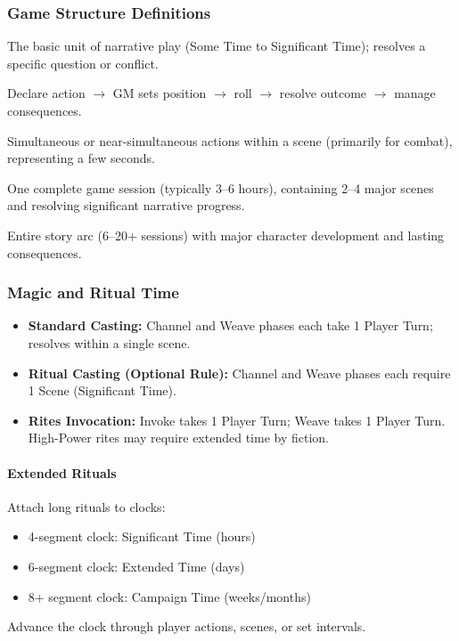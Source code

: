 \subsubsection{Game Structure Definitions}
\begin{description}[leftmargin=1.5em, labelindent=0em]
  \item[Scene] The basic unit of narrative play (Some Time to Significant Time); resolves a specific question or conflict.
  \item[Player Turn (Beat)] Declare action $\rightarrow$ GM sets position $\rightarrow$ roll $\rightarrow$ resolve outcome $\rightarrow$ manage consequences.
  \item[Round] Simultaneous or near-simultaneous actions within a scene (primarily for combat), representing a few seconds.
  \item[Session] One complete game session (typically 3–6 hours), containing 2–4 major scenes and resolving significant narrative progress.
  \item[Campaign] Entire story arc (6–20+ sessions) with major character development and lasting consequences.
\end{description}

\subsubsection{Magic and Ritual Time}
\begin{itemize}
  \item \textbf{Standard Casting:} Channel and Weave phases each take 1 Player Turn; resolves within a single scene.
  \item \textbf{Ritual Casting (Optional Rule):} Channel and Weave phases each require 1 Scene (Significant Time).
  \item \textbf{Rites Invocation:} Invoke takes 1 Player Turn; Weave takes 1 Player Turn. High-Power rites may require extended time by fiction.
\end{itemize}

\paragraph{Extended Rituals}
Attach long rituals to clocks:
\begin{itemize}
  \item 4-segment clock: Significant Time (hours)
  \item 6-segment clock: Extended Time (days)
  \item 8+ segment clock: Campaign Time (weeks/months)
\end{itemize}
Advance the clock through player actions, scenes, or set intervals.

